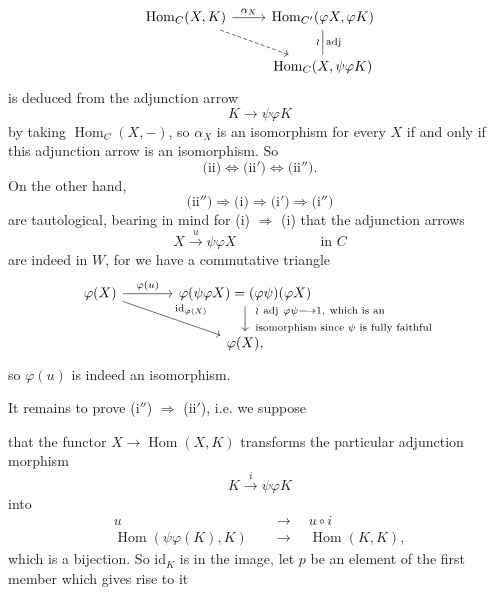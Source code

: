\documentclass[11pt]{article}
\newcommand{\printedpage}[1]{\marginpar{\footnotesize p.~#1}}
\newcommand{\msp}[1]{\marginpar{\footnotesize [#1]}}
\newcommand{\Hom}{\operatorname{Hom}}
\newcommand{\id}{\mathrm{id}}
\begin{document}
\printedpage{24}

\[
\begin{tikzcd}
\Hom_C(X,K) \arrow[r,"\alpha_X"] \arrow[dr,dashed] & \Hom_{C'}(\varphi X,\varphi K) \arrow[d,dash,"\wr"',"\mathrm{adj}"] \\
 & \Hom_C(X,\psi\varphi K)
\end{tikzcd}
\]
is deduced from the adjunction arrow
\[
K \longrightarrow \psi\varphi K
\]
by taking $\Hom_C(X,-)$, so $\alpha_X$ is an isomorphism for every $X$ if and only if this adjunction arrow is an isomorphism. So
\[
\text{(ii)} \Longleftrightarrow \text{(ii$'$)} \Longleftrightarrow \text{(ii$''$)}.
\]
On the other hand,
\[
\text{(ii$''$)} \Longrightarrow \text{(i)} \Longrightarrow \text{(i$'$)} \Longrightarrow \text{(i$''$)}
\]
are tautological, bearing in mind for (i) $\Longrightarrow$ (i) that the adjunction arrows
\[
X \xrightarrow{u} \psi\varphi X \qquad\qquad\qquad \text{in } C
\]
are indeed in $W$, for we have a commutative triangle
\[
\begin{tikzcd}[column sep=large]
\varphi(X) \arrow[r,"\varphi(u)"] \arrow[dr,"\id_{\varphi(X)}"] & \varphi(\psi\varphi X) = (\varphi\psi)(\varphi X) \arrow[d,"{\begin{array}{l}\wr\ \mathrm{adj}\ \varphi\psi \longrightarrow 1,\ \text{which is an}\\ \text{isomorphism since } \psi \text{ is fully faithful}\end{array}}"] \\
 & \varphi(X),
\end{tikzcd}
\]
so $\varphi(u)$ is indeed an isomorphism.

It remains to prove (i$''$) $\Longrightarrow$ (ii$'$), i.e. we suppose

\noindent\msp{page 39}%
that the functor $X \longrightarrow \Hom(X,K)$ transforms the particular adjunction morphism
\[
K \xrightarrow{i} \psi\varphi K
\]
into
\[
\begin{aligned}
u \quad &\longrightarrow \quad u\circ i\\
\Hom(\psi\varphi(K),K) \quad &\longrightarrow \quad \Hom(K,K),
\end{aligned}
\]
which is a bijection. So $\id_K$ is in the image, let $p$ be an element of the first member which gives rise to it

\printedpage{25}
\end{document}
